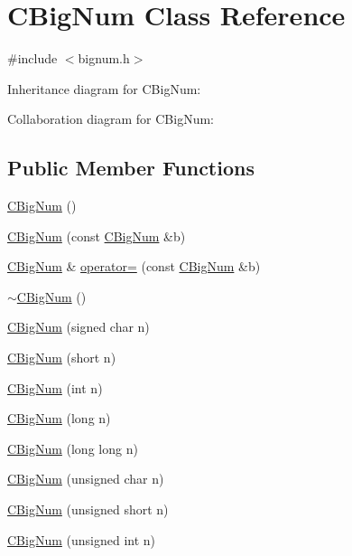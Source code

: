 \hypertarget{class_c_big_num}{}\section{C\+Big\+Num Class Reference}
\label{class_c_big_num}


{\ttfamily \#include $<$bignum.\+h$>$}



Inheritance diagram for C\+Big\+Num\+:


Collaboration diagram for C\+Big\+Num\+:
\subsection*{Public Member Functions}
\begin{DoxyCompactItemize}
\item 
\hyperlink{class_c_big_num_a272ed55454635b770e181bddc1a9c071}{C\+Big\+Num} ()
\item 
\hyperlink{class_c_big_num_a50fcecb7d672c2b7d0a89e641a0682ca}{C\+Big\+Num} (const \hyperlink{class_c_big_num}{C\+Big\+Num} \&b)
\item 
\hyperlink{class_c_big_num}{C\+Big\+Num} \& \hyperlink{class_c_big_num_a575e705d2120b0a43d74d798eaef48ee}{operator=} (const \hyperlink{class_c_big_num}{C\+Big\+Num} \&b)
\item 
\hyperlink{class_c_big_num_a0cf323763ff64c47cac7ababd2f23683}{$\sim$\+C\+Big\+Num} ()
\item 
\hyperlink{class_c_big_num_a318644830d41471cd2bbcd702975bbb1}{C\+Big\+Num} (signed char n)
\item 
\hyperlink{class_c_big_num_a0f4e34dcc48e9089e9f20c06418755c9}{C\+Big\+Num} (short n)
\item 
\hyperlink{class_c_big_num_a930e53591ce24f650f7ddd1076bd4efe}{C\+Big\+Num} (int n)
\item 
\hyperlink{class_c_big_num_a96ef554f3153f676125a49889303cf31}{C\+Big\+Num} (long n)
\item 
\hyperlink{class_c_big_num_a221b65c70969363c1b9d940a6a2de3b5}{C\+Big\+Num} (long long n)
\item 
\hyperlink{class_c_big_num_afe63a4eb433e69687fad44193390dc1b}{C\+Big\+Num} (unsigned char n)
\item 
\hyperlink{class_c_big_num_a3745ad1eb1bd53c9535f8620515d3ae3}{C\+Big\+Num} (unsigned short n)
\item 
\hyperlink{class_c_big_num_a87ff912ff941f4bc4ba10482c502757d}{C\+Big\+Num} (unsigned int n)
\item 

\end{DoxyCompactItemize}
